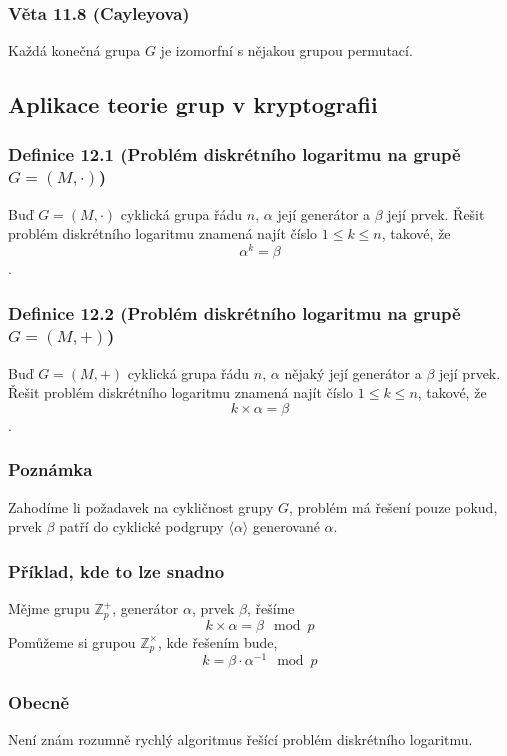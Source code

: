 \documentclass[12pt, letterpaper]{article}
\begin{document}
\subsubsection*{Věta 11.8 (Cayleyova)}
Každá konečná grupa $G$ je izomorfní s nějakou grupou permutací. 

\subsection{Aplikace teorie grup v kryptografii}

\subsubsection*{Definice 12.1 (Problém diskrétního logaritmu na grupě $G = (M, \cdot)$)}
Buď $G = (M, \cdot)$ cyklická grupa řádu $n$, $\alpha$ její generátor a $\beta$ její prvek.
Řešit problém diskrétního logaritmu znamená najít číslo $1 \leq k \leq n$, takové, že
\[ \alpha^k = \beta \].

\subsubsection*{Definice 12.2 (Problém diskrétního logaritmu na grupě $G = (M, +)$)}
Buď $G = (M, +)$ cyklická grupa řádu $n$, $\alpha$ nějaký její generátor a $\beta$ její prvek.
Řešit problém diskrétního logaritmu znamená najít číslo $1 \leq k \leq n$, takové, že
\[ k \times \alpha = \beta \].

\subsubsection*{Poznámka}
Zahodíme li požadavek na cykličnost grupy $G$, problém má řešení pouze pokud,
prvek $\beta$ patří do cyklické podgrupy $\langle \alpha \rangle$ generované $\alpha$.

\subsubsection*{Příklad, kde to lze snadno}
Mějme grupu $\mathbb{Z}^+_p$, generátor $\alpha$, prvek $\beta$, řešíme
\[k \times \alpha = \beta \mod p\]
Pomůžeme si grupou $\mathbb{Z}^\times_p$, kde řešením bude,
\[k = \beta \cdot \alpha^{-1} \mod p\]

\subsubsection*{Obecně}
Není znám rozumně rychlý algoritmus řešící problém diskrétního logaritmu.
\end{document}
